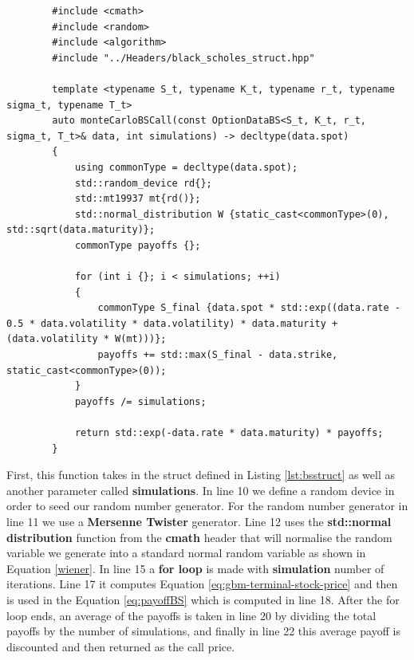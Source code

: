 \documentclass[12pt]{article}
\numberwithin{equation}{section}
\begin{document}
\begin{listing}[H]
	\begin{verbatim}
		#include <cmath>
		#include <random>
		#include <algorithm>
		#include "../Headers/black_scholes_struct.hpp"

		template <typename S_t, typename K_t, typename r_t, typename sigma_t, typename T_t>
		auto monteCarloBSCall(const OptionDataBS<S_t, K_t, r_t, sigma_t, T_t>& data, int simulations) -> decltype(data.spot)
		{
			using commonType = decltype(data.spot);
			std::random_device rd{};
			std::mt19937 mt{rd()};
			std::normal_distribution W {static_cast<commonType>(0), std::sqrt(data.maturity)};
			commonType payoffs {};
			
			for (int i {}; i < simulations; ++i)
			{
				commonType S_final {data.spot * std::exp((data.rate - 0.5 * data.volatility * data.volatility) * data.maturity + (data.volatility * W(mt)))};
				payoffs += std::max(S_final - data.strike, static_cast<commonType>(0));
			}
			payoffs /= simulations;
			
			return std::exp(-data.rate * data.maturity) * payoffs;
		}
	\end{verbatim}
	\caption{Black-Scholes Call using Monte Carlo Simulations}
	\label{lst:bsmontecarloCall}
\end{listing}
\FloatBarrier
First, this function takes in the struct defined in Listing \ref{lst:bsstruct} as well as another parameter called \textbf{simulations}. \newline In line 10 we define a random device in order to seed our random number generator. For the random number generator in line 11 we use a \textbf{Mersenne Twister} generator. \newline Line 12 uses the \textbf{std::normal distribution} function from the \textbf{cmath} header that will normalise the random variable we generate into a standard normal random variable as shown in Equation \ref{wiener}. In line 15 a \textbf{for loop} is made with \textbf{simulation} number of iterations. \newline Line 17 it computes Equation \ref{eq:gbm-terminal-stock-price} and then is used in the Equation \ref{eq:payoffBS} which is computed in line 18. \newline After the for loop ends, an average of the payoffs is taken in line 20 by dividing the total payoffs by the number of simulations, and finally in line 22 this average payoff is discounted and then returned as the call price. 
\end{document}
